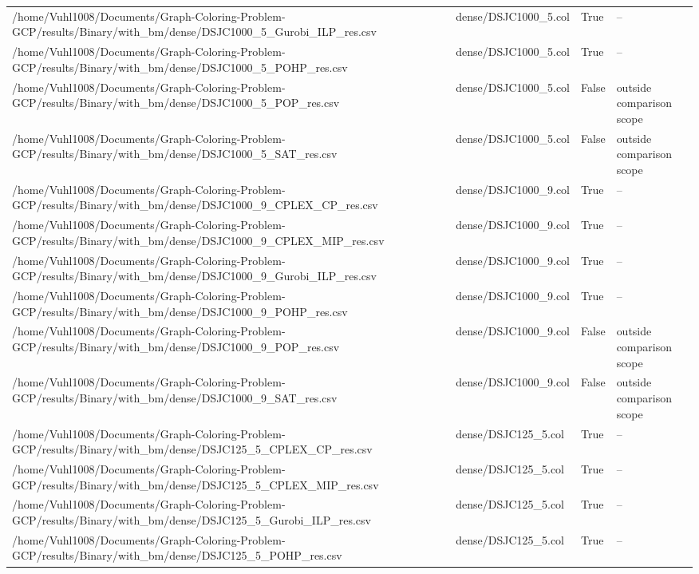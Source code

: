 \begin{table}[htbp]
\begin{tabular}{llll}
/home/Vuhl1008/Documents/Graph-Coloring-Problem-GCP/results/Binary/with\_bm/dense/DSJC1000\_5\_Gurobi\_ILP\_res.csv & dense/DSJC1000\_5.col & True & -- \\
/home/Vuhl1008/Documents/Graph-Coloring-Problem-GCP/results/Binary/with\_bm/dense/DSJC1000\_5\_POHP\_res.csv & dense/DSJC1000\_5.col & True & -- \\
/home/Vuhl1008/Documents/Graph-Coloring-Problem-GCP/results/Binary/with\_bm/dense/DSJC1000\_5\_POP\_res.csv & dense/DSJC1000\_5.col & False & outside comparison scope \\
/home/Vuhl1008/Documents/Graph-Coloring-Problem-GCP/results/Binary/with\_bm/dense/DSJC1000\_5\_SAT\_res.csv & dense/DSJC1000\_5.col & False & outside comparison scope \\
/home/Vuhl1008/Documents/Graph-Coloring-Problem-GCP/results/Binary/with\_bm/dense/DSJC1000\_9\_CPLEX\_CP\_res.csv & dense/DSJC1000\_9.col & True & -- \\
/home/Vuhl1008/Documents/Graph-Coloring-Problem-GCP/results/Binary/with\_bm/dense/DSJC1000\_9\_CPLEX\_MIP\_res.csv & dense/DSJC1000\_9.col & True & -- \\
/home/Vuhl1008/Documents/Graph-Coloring-Problem-GCP/results/Binary/with\_bm/dense/DSJC1000\_9\_Gurobi\_ILP\_res.csv & dense/DSJC1000\_9.col & True & -- \\
/home/Vuhl1008/Documents/Graph-Coloring-Problem-GCP/results/Binary/with\_bm/dense/DSJC1000\_9\_POHP\_res.csv & dense/DSJC1000\_9.col & True & -- \\
/home/Vuhl1008/Documents/Graph-Coloring-Problem-GCP/results/Binary/with\_bm/dense/DSJC1000\_9\_POP\_res.csv & dense/DSJC1000\_9.col & False & outside comparison scope \\
/home/Vuhl1008/Documents/Graph-Coloring-Problem-GCP/results/Binary/with\_bm/dense/DSJC1000\_9\_SAT\_res.csv & dense/DSJC1000\_9.col & False & outside comparison scope \\
/home/Vuhl1008/Documents/Graph-Coloring-Problem-GCP/results/Binary/with\_bm/dense/DSJC125\_5\_CPLEX\_CP\_res.csv & dense/DSJC125\_5.col & True & -- \\
/home/Vuhl1008/Documents/Graph-Coloring-Problem-GCP/results/Binary/with\_bm/dense/DSJC125\_5\_CPLEX\_MIP\_res.csv & dense/DSJC125\_5.col & True & -- \\
/home/Vuhl1008/Documents/Graph-Coloring-Problem-GCP/results/Binary/with\_bm/dense/DSJC125\_5\_Gurobi\_ILP\_res.csv & dense/DSJC125\_5.col & True & -- \\
/home/Vuhl1008/Documents/Graph-Coloring-Problem-GCP/results/Binary/with\_bm/dense/DSJC125\_5\_POHP\_res.csv & dense/DSJC125\_5.col & True & -- \\

\end{tabular}
\end{table}
